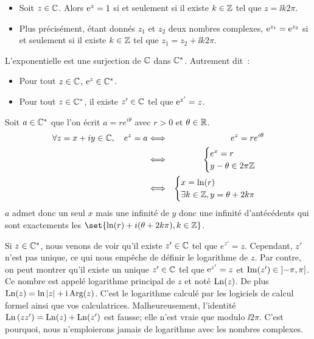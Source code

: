 \documentclass{magnolia}
\begin{document}
\begin{proposition}[utile=-3]
\begin{itemize}
\item Soit $z\in\mathbb{C}$. Alors ${\rm e}^z=1$ si et seulement si il existe
  $k\in\mathbb{Z}$ tel que $z=\ii k2\pi$.
\item  Plus précisément, étant donnés $z_1$ et $z_2$ deux nombres
  complexes, ${\rm e}^{z_1}={\rm e}^{z_2}$ si et seulement si il existe
  $k\in\mathbb{Z}$ tel que $z_1=z_2+\ii k2\pi$.
\end{itemize}
\end{proposition}

\begin{proposition}[utile=-3]
L'exponentielle est une surjection de $\mathbb{C}$ dans $\mathbb{C}^*$. Autrement dit~:
\begin{itemize}
\item Pour tout $z\in\mathbb{C}$, ${\rm e}^{z}\in\mathbb{C}^*$.
\item Pour tout $z\in\mathbb{C}^*$, il existe $z'\in\mathbb{C}$ tel que ${\rm e}^{z'}=z$.
\end{itemize}
\end{proposition}

\begin{preuve}
Soit $a\in \mathbb{C}^*$ que l'on écrit $a=re^{i\theta}$ avec $r>0$ et $\theta \in \mathbb{R}$.
\begin{eqnarray*}
\forall z=x+iy \in \mathbb{C}, \quad e^z=a & \Longleftrightarrow &e^z=re^{i\theta} \\
& \Longleftrightarrow & \begin{cases}
    e^x=r\\
    y-\theta \in 2\pi\mathbb{Z}
    \end{cases}\\
& \Longleftrightarrow & \begin{cases}
    x=\ln(r)\\
    \exists k \in \mathbb{Z}, y=\theta+2k\pi
    \end{cases}
\end{eqnarray*}
$a$ admet donc un seul $x$ mais une infinité de $y$ donc une infinité d'antécédents qui sont exactements les $\set{\ln(r)+i(\theta+2k\pi), k\in \Z}$.


\end{preuve}

\begin{remarqueUnique}
\remarque Si $z\in\mathbb{C}^*$, nous venons de voir qu'il existe $z'\in\mathbb{C}$ tel que
  $e^{z'}=z$. Cependant, $z'$ n'est pas unique, ce qui nous empêche de définir
  le logarithme de $z$. Par contre, on peut montrer qu'il existe un unique $z'\in\mathbb{C}$ tel que ${\rm e}^{z'}=z$ et
  $\mathop{\rm Im}(z')\in\left]-\pi,\pi\right]$. Ce nombre est appelé logarithme
  principal de $z$ et noté $\operatorname{Ln}(z)$. De plus $\operatorname{Ln}(z)=\ln\left|z\right|+{\rm i}\operatorname{Arg}(z)$. C'est le logarithme calculé par les logiciels de calcul formel ainsi que vos calculatrices. Malheureusement, l'identité $\operatorname{Ln}\left(z z'\right)=\operatorname{Ln}(z)+\operatorname{Ln}(z')$ est fausse;
  elle n'est vraie que modulo $\ii2\pi$. C'est pourquoi, nous n'emploierons
  jamais de logarithme avec les nombres complexes.
\end{remarqueUnique}
\end{document}
